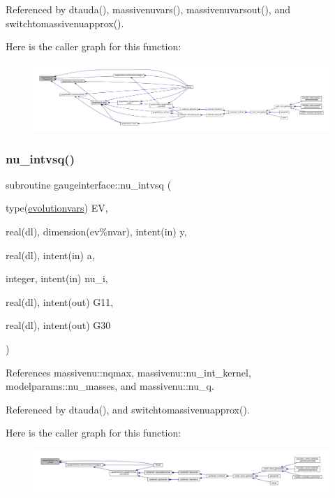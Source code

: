 Referenced by dtauda(), massivenuvars(), massivenuvarsout(), and switchtomassivenuapprox().

Here is the caller graph for this function\+:
\nopagebreak
\begin{figure}[H]
\begin{center}
\leavevmode
\includegraphics[width=350pt]{namespacegaugeinterface_aaf5da349a1adc87f4c62f51f1e0c0371_icgraph}
\end{center}
\end{figure}
\mbox{\label{namespacegaugeinterface_a2e8822823d298cb0912b5ec22ea4a6ff}} 
\subsubsection{\texorpdfstring{nu\+\_\+intvsq()}{nu\_intvsq()}}
{\footnotesize\ttfamily subroutine gaugeinterface\+::nu\+\_\+intvsq (\begin{DoxyParamCaption}\item[{type(\mbox{\hyperlink{structgaugeinterface_1_1evolutionvars}{evolutionvars}})}]{EV,  }\item[{real(dl), dimension(ev\%nvar), intent(in)}]{y,  }\item[{real(dl), intent(in)}]{a,  }\item[{integer, intent(in)}]{nu\+\_\+i,  }\item[{real(dl), intent(out)}]{G11,  }\item[{real(dl), intent(out)}]{G30 }\end{DoxyParamCaption})}



References massivenu\+::nqmax, massivenu\+::nu\+\_\+int\+\_\+kernel, modelparams\+::nu\+\_\+masses, and massivenu\+::nu\+\_\+q.



Referenced by dtauda(), and switchtomassivenuapprox().

Here is the caller graph for this function\+:
\nopagebreak
\begin{figure}[H]
\begin{center}
\leavevmode
\includegraphics[width=350pt]{namespacegaugeinterface_a2e8822823d298cb0912b5ec22ea4a6ff_icgraph}
\end{center}
\end{figure}
\mbox{\label{namespacegaugeinterface_a33373e2888fd46e2c443d7e8c2785639}} 
